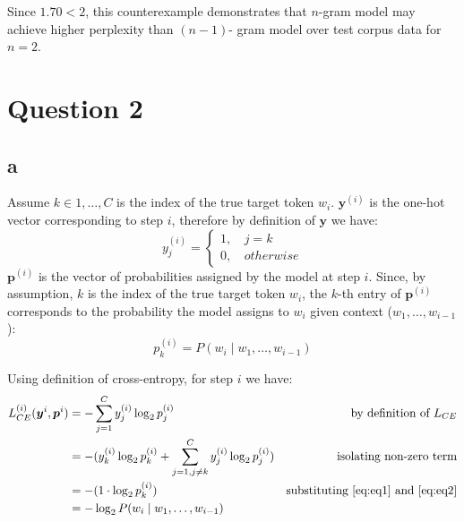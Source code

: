 \documentclass{article}
\numberwithin{equation}{section}
\begin{document}
    Since $1.70 < 2$, this counterexample demonstrates that $n$-gram model may achieve higher perplexity than $(n-1)$- gram model over test corpus data for $n=2$.


    \section*{Question 2}
    \subsection*{a}
    Assume $k \in {1, \dots, C}$ is the index of the true target token $w_i$. $\bm{y}^{(i)}$ is the one-hot vector corresponding to step $i$, therefore by definition of $\bm{y}$ we have:
    \begin{equation}
        y^{(i)}_j  =
            \begin{cases}
                1\text{, } &  j = k \\
                0\text{, } & otherwise
            \end{cases}\label{eq:eq1}
    \end{equation}
    $\bm{p}^{(i)}$ is the vector of probabilities assigned by the model at step $i$.
    Since, by assumption, $k$ is the index of the true target token $w_i$, the $k$-th entry of $\bm{p}^{(i)}$ corresponds to the probability the model assigns to
    $w_i$ given context ($w_1, \dots, w_{i-1}$):
    \begin{equation}
        p^{(i)}_k = P(w_i \mid w_1, \dots, w_{i-1})\label{eq:eq2}
    \end{equation}

    Using definition of cross-entropy, for step $i$ we have:
    \begin{align*}
        L_{CE}^{(i)}(\bm{y}^{i}, \bm{p}^{i}) &= -\sum_{j = 1}^{C}y^{(i)}_{j}\log_{2}p^{(i)}_j & \text{by definition of $L_{CE}$}  \\
            &= -(y^{(i)}_{k}\log_{2}p^{(i)}_k + \sum_{j = 1, j \neq k}^{C}y^{(i)}_{j}\log_{2}p^{(i)}_j) & \text{isolating non-zero term} \\
            &= -(1 \cdot \log_{2} p^{(i)}_k) & \text{substituting $\eqref{eq:eq1}$ and $\eqref{eq:eq2}$}  \\
            &= -\log_{2} P(w_i \mid w_1, \dots, w_{i-1}) \\
    \end{align*}
\end{document}
